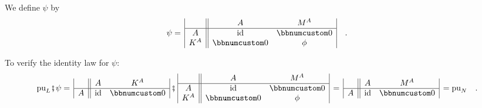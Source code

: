 We define $\psi$ by
\[
\psi=\,\begin{array}{|c||cc|}
 & A & M^{A}\\
\hline A & \text{id} & \bbnum 0\\
K^{A} & \bbnum 0 & \phi
\end{array}\quad.
\]

To verify the identity law for $\psi$:
\[
\text{pu}_{L}\bef\psi=\,\begin{array}{|c||cc|}
 & A & K^{A}\\
\hline A & \text{id} & \bbnum 0
\end{array}\,\bef\,\begin{array}{|c||cc|}
 & A & M^{A}\\
\hline A & \text{id} & \bbnum 0\\
K^{A} & \bbnum 0 & \phi
\end{array}\,=\,\begin{array}{|c||cc|}
 & A & M^{A}\\
\hline A & \text{id} & \bbnum 0
\end{array}\,=\text{pu}_{N}\quad.
\]


